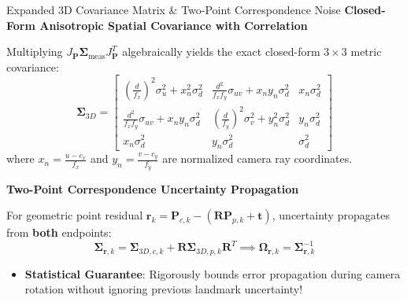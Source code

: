 \documentclass[aspectratio=169, 10pt]{beamer}
\begin{document}
\begin{frame}{Expanded 3D Covariance Matrix \& Two-Point Correspondence Noise}
  {\normalsize \textbf{\textcolor{NavyBlue}{Closed-Form Anisotropic Spatial Covariance with Correlation}}}
  \vspace{0.15cm}

  Multiplying $J_{\mathbf{P}} \mathbf{\Sigma}_{\text{meas}} J_{\mathbf{P}}^T$ algebraically yields the exact closed-form $3 \times 3$ metric covariance:
  \begin{equation}
    \mathbf{\Sigma}_{3D} = \begin{bmatrix}
      \left(\frac{d}{f_x}\right)^2 \sigma_u^2 + x_n^2 \sigma_d^2 & \frac{d^2}{f_x f_y} \sigma_{uv} + x_n y_n \sigma_d^2 & x_n \sigma_d^2 \\[8pt]
      \frac{d^2}{f_x f_y} \sigma_{uv} + x_n y_n \sigma_d^2 & \left(\frac{d}{f_y}\right)^2 \sigma_v^2 + y_n^2 \sigma_d^2 & y_n \sigma_d^2 \\[8pt]
      x_n \sigma_d^2 & y_n \sigma_d^2 & \sigma_d^2
    \end{bmatrix}
  \end{equation}
  where $x_n = \frac{u - c_x}{f_x}$ and $y_n = \frac{v - c_y}{f_y}$ are normalized camera ray coordinates.

  \vspace{0.25cm}
  {\normalsize \textbf{\textcolor{NavyBlue}{Two-Point Correspondence Uncertainty Propagation}}}
  \vspace{0.1cm}

  For geometric point residual $\mathbf{r}_k = \mathbf{P}_{c,k} - (\mathbf{R} \mathbf{P}_{p,k} + \mathbf{t})$, uncertainty propagates from \textbf{both} endpoints:
  \begin{equation}
    \mathbf{\Sigma}_{\mathbf{r}, k} = \mathbf{\Sigma}_{3D, c, k} + \mathbf{R} \mathbf{\Sigma}_{3D, p, k} \mathbf{R}^T \implies \mathbf{\Omega}_{\mathbf{r}, k} = \mathbf{\Sigma}_{\mathbf{r}, k}^{-1}
  \end{equation}
  \begin{itemize}
    \setlength{\itemsep}{2pt}
    \item \textbf{Statistical Guarantee}: Rigorously bounds error propagation during camera rotation without ignoring previous landmark uncertainty!
  \end{itemize}
\end{frame}
\end{document}
